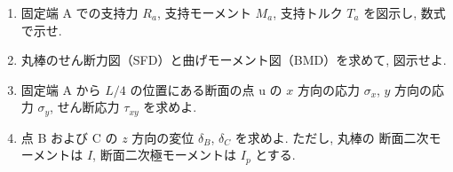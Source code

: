 \begin{enumerate}[label=(\arabic*)]
  \item 固定端 A での支持力 $R_a$, 支持モーメント $M_a$, 支持トルク $T_a$ を図示し, 数式で示せ.

  \item 丸棒のせん断力図（SFD）と曲げモーメント図（BMD）を求めて, 図示せよ.

  \item 固定端 A から $L/4$ の位置にある断面の点 u の $x$ 方向の応力 $\sigma_x$,
        $y$ 方向の応力 $\sigma_y$, せん断応力 $\tau_{xy}$ を求めよ.

  \item 点 B および C の $z$ 方向の変位 $\delta_B$, $\delta_C$ を求めよ. ただし, 丸棒の
        断面二次モーメントは $I$, 断面二次極モーメントは $I_p$ とする.
\end{enumerate}
